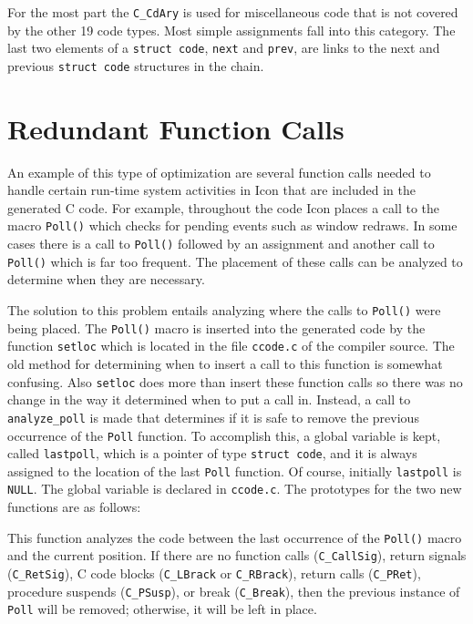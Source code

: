 For the most part the \texttt{C\_CdAry} is used for miscellaneous code
that is not covered by the other 19 code types. Most simple
assignments fall into this category. The last two elements of a
\texttt{struct code}, \texttt{next} and \texttt{prev}, are links to
the next and previous \texttt{struct code} structures in the chain.


\bigskip


\section{Redundant Function Calls}

An example of this type of optimization are several function calls
needed to handle certain run-time system activities in Icon that are
included in the generated C code. For example, throughout the code
Icon places a call to the macro \texttt{Poll()} which checks for
pending events such as window redraws. In some cases there is a call
to \texttt{Poll()} followed by an assignment and another call to
\texttt{Poll()} which is far too frequent. The placement of these
calls can be analyzed to determine when they are necessary.

The solution to this problem entails analyzing where the calls to
\texttt{Poll()} were being placed. The \texttt{Poll()} macro is
inserted into the generated code by the function \texttt{setloc} which
is located in the file \texttt{ccode.c} of the compiler source. The
old method for determining when to insert a call to this function is
somewhat confusing. Also \texttt{setloc} does more than insert these
function calls so there was no change in the way it determined when to
put a call in. Instead, a call to \texttt{analyze\_poll} is made that
determines if it is safe to remove the previous occurrence of the
\texttt{Poll} function. To accomplish this, a global variable is kept,
called \texttt{lastpoll}, which is a pointer of type \texttt{struct
code}, and it is always assigned to the location of the last
\texttt{Poll} function. Of course, initially \texttt{lastpoll} is
\texttt{NULL}. The global variable is declared in
\texttt{ccode.c}. The prototypes for the two new functions are as
follows:


This function analyzes the code between the last occurrence of the
\texttt{Poll()} macro and the current position. If there are no
function calls (\texttt{C\_CallSig}), return signals
(\texttt{C\_RetSig}), C code blocks (\texttt{C\_LBrack} or
\texttt{C\_RBrack}), return calls (\texttt{C\_PRet}), procedure
suspends (\texttt{C\_PSusp}), or break (\texttt{C\_Break}), then the
previous instance of \texttt{Poll} will be removed; otherwise, it will
be left in place.

